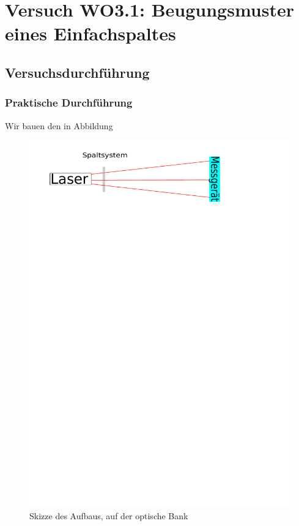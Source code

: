 \documentclass[12pt]{scrartcl}
\begin{document}
\section{Versuch WO3.1: Beugungsmuster eines Einfachspaltes}
\subsection{Versuchsdurchführung}

\subsubsection{Praktische Durchführung}
Wir bauen den in Abbildung 
\begin{figure}[H] 
  \centering
    \includegraphics[trim = 0mm 240mm 0mm 10mm, clip, scale = 1]{abb_17.pdf}
  	\caption[Skizze des Aufbaus, auf der optische Bank]{Skizze des Aufbaus, auf der optische Bank\footnotemark}
  \label{fig:abb_17}
\end{figure}
\end{document}
